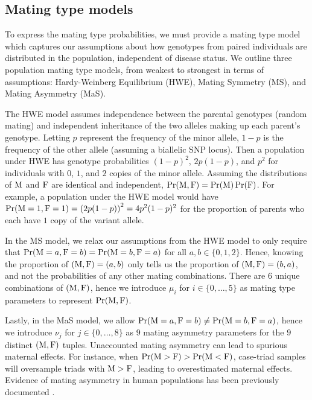\subsection{Mating type models}\label{sec:mt}

To express the mating type probabilities, we must provide a mating type model which captures our assumptions about how genotypes from paired individuals are distributed in the population, independent of disease status.
We outline three population mating type models, from weakest to strongest in terms of assumptions: Hardy-Weinberg Equilibrium (HWE), Mating Symmetry (MS), and Mating Asymmetry (MaS).

The HWE model assumes independence between the parental genotypes (random mating) and independent inheritance of the two alleles making up each parent's genotype.
Letting $p$ represent the frequency of the minor allele, $1-p$ is the frequency of the other allele (assuming a biallelic SNP locus).
Then a population under HWE has genotype probabilities $(1-p)^2$, $2p(1-p)$, and $p^2$ for individuals with $0$, $1$, and $2$ copies of the minor allele.
Assuming the distributions of ${\rm M}$ and ${\rm F}$ are identical and independent, $\Pr({\rm M}, {\rm F}) = \Pr({\rm M})\Pr({\rm F})$.
For example, a population under the HWE model would have $\Pr({\rm M} = 1, {\rm F} = 1) = \left(2p(1-p)\right)^2 = 4p^2(1-p)^2$ for the proportion of parents who each have $1$ copy of the variant allele.

In the MS model, we relax our assumptions from the HWE model to only require that $\Pr({\rm M} = a, {\rm F} = b) = \Pr({\rm M} = b, {\rm F} = a)$ for all $a, b \in \{0, 1, 2\}$.
Hence, knowing the proportion of $({\rm M}, {\rm F}) = (a, b)$ only tells us the proportion of $({\rm M}, {\rm F}) = (b, a)$, and not the probabilities of any other mating combinations.
There are $6$ unique combinations of $({\rm M}, {\rm F})$, hence we introduce $\mu_i$ for $i \in \{0, \ldots, 5\}$ as mating type parameters to represent $\Pr({\rm M}, {\rm F})$.

Lastly, in the MaS model, we allow $\Pr({\rm M} = a, {\rm F} = b) \neq \Pr({\rm M} = b, {\rm F} = a)$, hence we introduce $\nu_j$ for $j \in \{0, \ldots, 8\}$ as $9$ mating asymmetry parameters for the $9$ distinct $({\rm M}, {\rm F})$ tuples.
Unaccounted mating asymmetry can lead to spurious maternal effects.
For instance, when $\Pr({\rm M} > {\rm F}) > \Pr({\rm M} < {\rm F})$, case-triad samples will oversample triads with ${\rm M} > {\rm F}$, leading to overestimated maternal effects.
Evidence of mating asymmetry in human populations has been previously documented \cite{Heal+10, Bour+11}.


